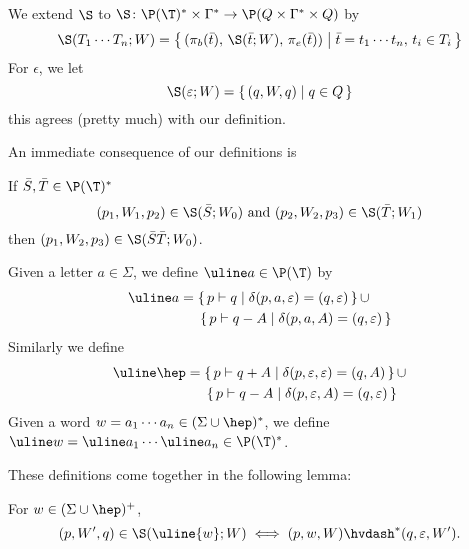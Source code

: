 \documentclass{llncs}
\begin{document}
We extend $\S$ to $\S\colon\P(\T)^*\times\Gamma^*\to\P(Q\times\Gamma^*\times Q)$ by
$$ \S(T_1\cdots T_n;W) = \set{(\pi_b(\bar t),\,\S(\bar t;W),\,\pi_e(\bar t))}[\bar t=t_1\cdots t_n,\,t_i\in T_i] $$
For $\epsilon$, we let
$$ \S(\epsilon;W) = \set{(q,W,q)}[q\in Q] $$
this agrees (pretty much) with our definition.

An immediate consequence of our definitions is

\begin{lemma}

    If $\bar S,\bar T\in\P(\T)^*$
    $$ (p_1,W_1,p_2)\in \S(\bar S;W_0) \hbox{ and } (p_2,W_2,p_3)\in \S(\bar T;W_1) $$
    then $(p_1,W_2,p_3)\in \S(\bar S\bar T;W_0)$.

\end{lemma}

Given a letter $a\in\Sigma$, we define $\uline a\in\P(\T)$ by
\begin{align*}
    \uline a &{}= \set{p\vdash q}[\delta(p,a,\epsilon)=(q,\epsilon)]\cup\\
    &\hphantom{{}={}} \set{p\vdash q-A}[\delta(p,a,A)=(q,\epsilon)]
\end{align*}
Similarly we define
\begin{align*}
    \uline\hep &= \set{p\vdash q+A}[\delta(p,\epsilon,\epsilon)=(q,A)]\cup\\
    &\hphantom{{}={}} \set{p\vdash q-A}[\delta(p,\epsilon,A)=(q,\epsilon)]
\end{align*}
Given a word $w=a_1\cdots a_n\in(\Sigma\cup\hep)^*$, we define $\uline w=\uline a_1\cdots\uline a_n\in\P(\T)^*$.

These definitions come together in the following lemma:

\begin{lemma}   \label{lem:stackandpda}

    For $w\in(\Sigma\cup\hep)^+$,
    $$ (p,W',q)\in \S(\uline{w};W) \iff (p,w,W)\hvdash^*(q,\epsilon,W') . $$

\end{lemma}
\end{document}
